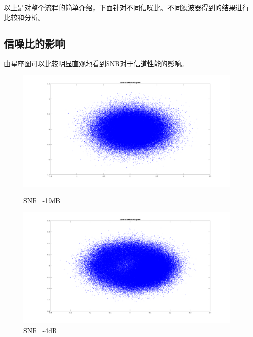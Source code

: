 \begin{spacing}{1.5}
以上是对整个流程的简单介绍，下面针对不同信噪比、不同滤波器得到的结果进行比较和分析。

\subsection{信噪比的影响}

由星座图可以比较明显直观地看到SNR对于信道性能的影响。

\begin{figure}[H]
\begin{minipage}[t]{0.5\linewidth}
\centering
\includegraphics[width=0.9\columnwidth]{constellation1.png}
\caption{SNR=-19dB}
\end{minipage}
\hfill
\begin{minipage}[t]{0.5\linewidth}
\centering
\includegraphics[width=0.9\columnwidth]{constellation2.png}
\caption{SNR=-4dB}
\end{minipage}
\end{figure}



\end{spacing}
